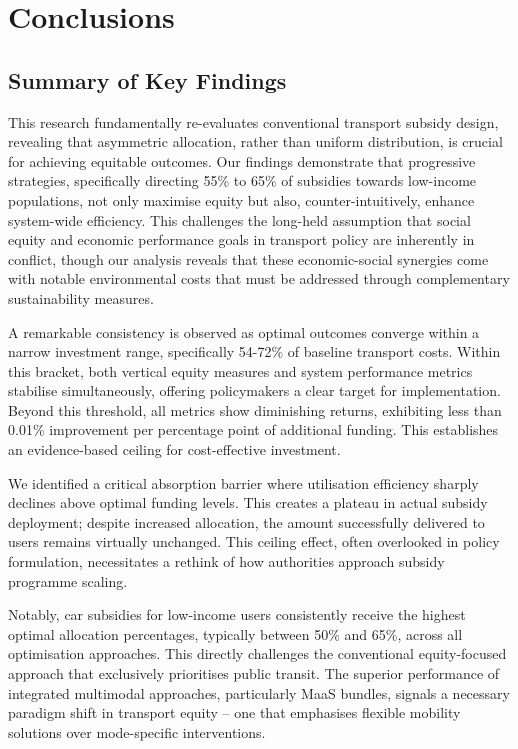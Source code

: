 \documentclass[a4paper,fleqn]{cas-sc}
\begin{document}
\section{Conclusions}\label{sec:conclusions}

\subsection{Summary of Key Findings}
This research fundamentally re-evaluates conventional transport subsidy design, revealing that asymmetric allocation, rather than uniform distribution, is crucial for achieving equitable outcomes. Our findings demonstrate that progressive strategies, specifically directing 55\% to 65\% of subsidies towards low-income populations, not only maximise equity but also, counter-intuitively, enhance system-wide efficiency. This challenges the long-held assumption that social equity and economic performance goals in transport policy are inherently in conflict, though our analysis reveals that these economic-social synergies come with notable environmental costs that must be addressed through complementary sustainability measures.

A remarkable consistency is observed as optimal outcomes converge within a narrow investment range, specifically 54-72\% of baseline transport costs. Within this bracket, both vertical equity measures and system performance metrics stabilise simultaneously, offering policymakers a clear target for implementation. Beyond this threshold, all metrics show diminishing returns, exhibiting less than 0.01\% improvement per percentage point of additional funding. This establishes an evidence-based ceiling for cost-effective investment.

We identified a critical absorption barrier where utilisation efficiency sharply declines above optimal funding levels. This creates a plateau in actual subsidy deployment; despite increased allocation, the amount successfully delivered to users remains virtually unchanged. This ceiling effect, often overlooked in policy formulation, necessitates a rethink of how authorities approach subsidy programme scaling.

Notably, car subsidies for low-income users consistently receive the highest optimal allocation percentages, typically between 50\% and 65\%, across all optimisation approaches. This directly challenges the conventional equity-focused approach that exclusively prioritises public transit. The superior performance of integrated multimodal approaches, particularly MaaS bundles, signals a necessary paradigm shift in transport equity – one that emphasises flexible mobility solutions over mode-specific interventions.
\end{document}
